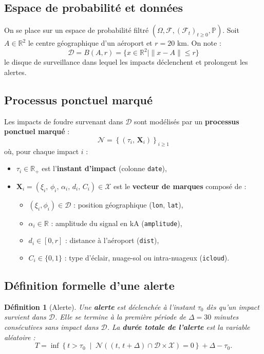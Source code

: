 \documentclass[a4paper,11pt]{article}
\newtheorem{definition}{Définition}[section]
\begin{document}
\subsection{Espace de probabilité et données}

On se place sur un espace de probabilité filtré $(\Omega, \mathcal{F}, (\mathcal{F}_t)_{t \geq 0}, \mathbb{P})$. Soit $A \in \mathbb{R}^2$ le centre géographique d'un aéroport et $r = 20$ km. On note :
\[
\mathcal{D} = B(A, r) = \{ x \in \mathbb{R}^2 \mid \|x - A\| \leq r \}
\]
le disque de surveillance dans lequel les impacts déclenchent et prolongent les alertes.

\subsection{Processus ponctuel marqué}

Les impacts de foudre survenant dans $\mathcal{D}$ sont modélisés par un \textbf{processus ponctuel marqué} :
\[
\mathcal{N} = \left\{ \left( \tau_i,\, \mathbf{X}_i \right) \right\}_{i \geq 1}
\]
où, pour chaque impact $i$ :
\begin{itemize}
    \item $\tau_i \in \mathbb{R}_+$ est l'\textbf{instant d'impact} (colonne \texttt{date}),
    \item $\mathbf{X}_i = (\xi_i,\, \phi_i,\, \alpha_i,\, d_i,\, C_i) \in \mathcal{X}$ est le \textbf{vecteur de marques} composé de :
    \begin{itemize}
        \item $(\xi_i, \phi_i) \in \mathcal{D}$ : position géographique (\texttt{lon}, \texttt{lat}),
        \item $\alpha_i \in \mathbb{R}$ : amplitude du signal en kA (\texttt{amplitude}),
        \item $d_i \in [0, r]$ : distance à l'aéroport (\texttt{dist}),
        \item $C_i \in \{0, 1\}$ : type d'éclair, nuage-sol ou intra-nuageux (\texttt{icloud}).
    \end{itemize}
\end{itemize}

\subsection{Définition formelle d'une alerte}

\begin{definition}[Alerte]
Une \textbf{alerte} est déclenchée à l'instant $\tau_0$ dès qu'un impact survient dans $\mathcal{D}$. Elle se termine à la première période de $\Delta = 30$ minutes consécutives sans impact dans $\mathcal{D}$. La \textbf{durée totale de l'alerte} est la variable aléatoire :
\[
T = \inf \left\{ t > \tau_0 \;\middle|\; \mathcal{N}\!\left((t,\, t + \Delta) \cap \mathcal{D} \times \mathcal{X}\right) = 0 \right\} + \Delta - \tau_0.
\]
\end{definition}
\end{document}
